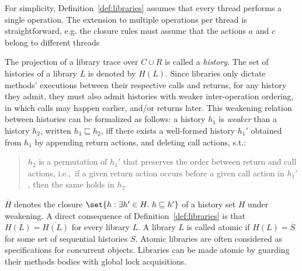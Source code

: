 For simplicity, Definition~\ref{def:libraries} assumes that every thread performs a single operation. The extension to multiple operations per thread is straightforward, e.g. the closure rules must assume that the actions $a$ and $c$ belong to different threads

The projection of a library trace over $C\cup R$ is called a \emph{history}. The set of histories of a library $L$ is denoted by $H(L)$.
Since libraries only dictate methods’ executions between their respective calls and returns, for any history they admit, they must also 
admit histories with weaker inter-operation ordering, in which calls may happen earlier, and/or returns later. This weakening relation
between histories can be formalized as follows: a history $h_1$ is \emph{weaker} than a history $h_2$, written $h_1 \sqsubseteq h_2$, 
if{f} there exists a well-formed history $h_1'$
obtained from $h_1$ by appending return actions, and deleting call actions,
s.t.:
\begin{quote}

  $h_2$ is a permutation of $h_1'$ that preserves the order between
  return and call actions, i.e.,~if a given return action occurs before a given
  call action in $h_1'$, then the same holds in $h_2$.

\end{quote}

$\overline{H}$ denotes the closure $\set{h: \exists h' \in H.\ h \sqsubseteq h'}$ of a 
history set $H$ under weakening.
A direct consequence of Definition~\ref{def:libraries} is that $H(L)=\overline{H(L)}$ for
every library $L$. %
A library $L$ is called atomic if $H(L)=\overline{S}$ for some set of sequential histories $S$.
Atomic libraries are often considered as specifications for concurrent objects. 
Libraries can be made atomic by guarding their methods bodies with global lock acquisitions.

